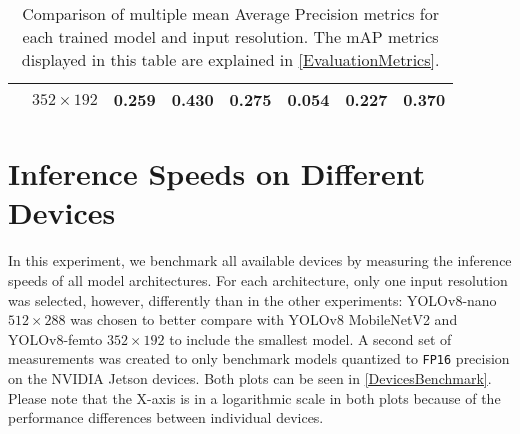 \begin{table}
\begin{tabular}{|c|c|rrrrrr|}
        \cline{2-2}
                                     & \multirow{1}{*}{$352\times192$}  & 0.259 & 0.430 & 0.275 & 0.054 & 0.227 & 0.370 \\
        \hline
    \end{tabular}
    \caption{Comparison of multiple mean Average Precision metrics for each
    trained model and input resolution. The mAP metrics displayed in this table
    are explained in \autoref{EvaluationMetrics}.}
    \label{mAPTableSmall}
\end{table}






\section{Inference Speeds on Different Devices}



In this experiment, we benchmark all available devices by measuring the
inference speeds of all model architectures. For each architecture, only one
input resolution was selected, however, differently than in the other
experiments: YOLOv8-nano $512 \times 288$ was chosen to better compare with
YOLOv8 MobileNetV2 and YOLOv8-femto $352 \times 192$ to include the smallest
model. A second set of measurements was created to only benchmark models
quantized to \texttt{FP16} precision on the NVIDIA Jetson devices. Both plots
can be seen in \autoref{DevicesBenchmark}. Please note that the X-axis is in a
logarithmic scale in both plots because of the performance differences between
individual devices.

